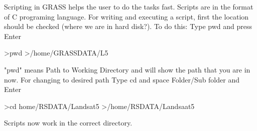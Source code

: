 Scripting in GRASS helps the user to do the tasks fast. Scripts are in the format of C programing language. For writing and executing a script, first the location should be checked (where we are in hard disk?). To do this:\newline
Type pwd and press Enter\newline
\begin{smallverbatim}
>pwd
>/home/GRASSDATA/L5
\end{smallverbatim}

"pwd" means Path to Working Directory and will show the path that you are in now.\newline
For changing to desired path\newline
Type cd and space Folder/Sub folder and Enter\newline 
\begin{smallverbatim}
>cd home/RSDATA/Landsat5
>/home/RSDATA/Landsaat5
\end{smallverbatim}

Scripts now work in the correct directory.\newline 

